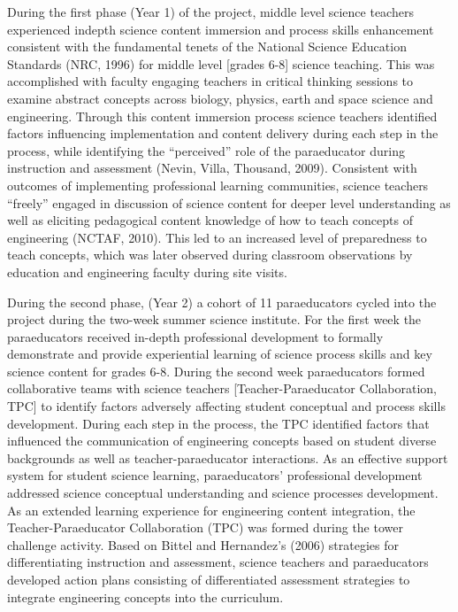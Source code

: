\documentclass[11.5pt]{sig-alternate} %
\begin{document}
\begin{large}
During the first phase (Year 1) of the project, middle level science teachers experienced indepth science content immersion and process skills enhancement consistent with the fundamental tenets of the National Science Education Standards (NRC, 1996) for middle level [grades 6-8] science teaching. This was accomplished with faculty engaging teachers in critical thinking sessions to examine abstract concepts across biology, physics, earth and space science and engineering. Through this content immersion process science teachers identified factors influencing implementation and content delivery during each step in the process, while identifying the “perceived” role of the paraeducator during instruction and assessment (Nevin, Villa, Thousand, 2009). Consistent with outcomes of implementing professional learning communities, science teachers “freely” engaged in discussion of science content for deeper level understanding as well as eliciting pedagogical content knowledge of how to teach concepts of engineering (NCTAF, 2010). This led to an increased level of preparedness to teach concepts, which was later observed during classroom observations by education and engineering faculty during site visits. 

During the second phase, (Year 2) a cohort of 11 paraeducators cycled into the project during the two-week summer science institute. For the first week the paraeducators received in-depth professional development to formally demonstrate and provide experiential learning of science process skills and key science content for grades 6-8. During the second week paraeducators formed collaborative teams with science teachers [Teacher-Paraeducator Collaboration, TPC] to identify factors adversely affecting student conceptual and process skills development. During each step in the process, the TPC identified factors that influenced the communication of engineering concepts based on student diverse backgrounds as well as teacher-paraeducator interactions. As an effective support system for student science learning, paraeducators’ professional development addressed science conceptual understanding and science processes development. As an extended learning experience for engineering content integration, the Teacher-Paraeducator Collaboration (TPC) was formed during the tower challenge activity. Based on Bittel and Hernandez’s (2006) strategies for differentiating instruction and assessment, science teachers and paraeducators developed action plans consisting of differentiated assessment strategies to integrate engineering concepts into the curriculum.


\end{large}
\end{document}
